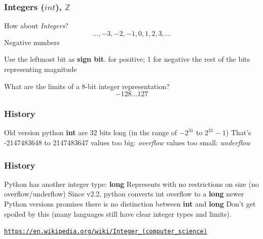 \documentclass[11pt]{beamer}
\begin{document}
\begin{frame}
  \frametitle{Integers ($int$), $\mathbb{Z}$}
  \Enlarge

  \begin{itemize}
  \myitem  How about \emph{Integers}? \\ 
  $$ ..., -3, -2, -1, 0, 1, 2, 3, ... $$\vspace{-2mm}  \pause
  \myitem Negative numbers  \pause
  	\begin{itemize}
		\mysubitem Use the leftmost bit as \textbf{sign bit}. \pause
		 for positive; 1 for negative\pause
		\mysubitem the rest of the bits representing magnitude\pause
	\end{itemize}
  \myitem What are the limits of a 8-bit integer representation?\\ \pause
    $$ -128 ... 127 $$
  \end{itemize}
\end{frame}

\begin{frame}
  \frametitle{History}
  \Enlarge

  \begin{itemize}
  \myitem Old version python {\bf int} are 32 bits long (in the range of $-2^{31}$ to $2^{31}-1$) 
  \myitem That's -2147483648 to 2147483647
  \myitem values too big: \emph{overflow}
  \myitem values too small: \emph{underflow}
  \end{itemize}
\end{frame}

\begin{frame}
  \frametitle{History}
  \Enlarge

  \begin{itemize}
  \myitem Python has another integer type: {\bf long} 
  \myitem Represents with no restrictions on size (no overflow/underflow) \pause
  \myitem Since v2.2, python converts int overflow to a {\bf long} \pause
  \myitem newer Python versions promises there is no distinction between {\bf int} and {\bf long} \pause
  \myitem Don't get spoiled by this (many languages still have clear integer types and limits).
  \end{itemize}
  
  \textcolor{blue}{\small \texttt{\url{https://en.wikipedia.org/wiki/Integer_(computer_science)}}} 
  
\end{frame}
\end{document}
